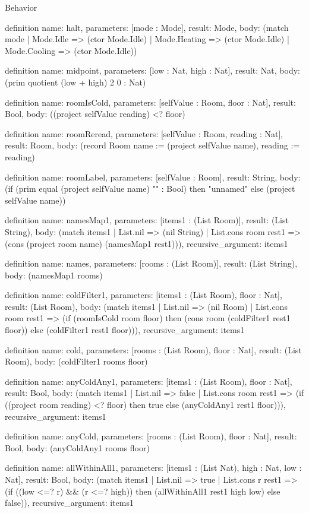 \begin{lexlean}{Behavior}
\begin{semanticmodule}
definition{
  name: halt,
  parameters: [mode : Mode],
  result: Mode,
  body: (match mode
    | Mode.Idle => (ctor Mode.Idle)
    | Mode.Heating => (ctor Mode.Idle)
    | Mode.Cooling => (ctor Mode.Idle))
}

definition{
  name: midpoint,
  parameters: [low : Nat, high : Nat],
  result: Nat,
  body: (prim quotient (low + high) 2 0 : Nat)
}

definition{
  name: roomIsCold,
  parameters: [selfValue : Room, floor : Nat],
  result: Bool,
  body: ((project selfValue reading) <? floor)
}

definition{
  name: roomReread,
  parameters: [selfValue : Room, reading : Nat],
  result: Room,
  body: (record Room {name := (project selfValue name), reading := reading})
}

definition{
  name: roomLabel,
  parameters: [selfValue : Room],
  result: String,
  body: (if (prim equal (project selfValue name) "" : Bool) then "unnamed" else (project selfValue name))
}

definition{
  name: namesMap1,
  parameters: [items1 : (List Room)],
  result: (List String),
  body: (match items1
    | List.nil => (nil String)
    | List.cons room rest1 => (cons (project room name) (namesMap1 rest1))),
  recursive_argument: items1
}

definition{
  name: names,
  parameters: [rooms : (List Room)],
  result: (List String),
  body: (namesMap1 rooms)
}

definition{
  name: coldFilter1,
  parameters: [items1 : (List Room), floor : Nat],
  result: (List Room),
  body: (match items1
    | List.nil => (nil Room)
    | List.cons room rest1 => (if (roomIsCold room floor) then (cons room (coldFilter1 rest1 floor)) else (coldFilter1 rest1 floor))),
  recursive_argument: items1
}

definition{
  name: cold,
  parameters: [rooms : (List Room), floor : Nat],
  result: (List Room),
  body: (coldFilter1 rooms floor)
}

definition{
  name: anyColdAny1,
  parameters: [items1 : (List Room), floor : Nat],
  result: Bool,
  body: (match items1
    | List.nil => false
    | List.cons room rest1 => (if ((project room reading) <? floor) then true else (anyColdAny1 rest1 floor))),
  recursive_argument: items1
}

definition{
  name: anyCold,
  parameters: [rooms : (List Room), floor : Nat],
  result: Bool,
  body: (anyColdAny1 rooms floor)
}

definition{
  name: allWithinAll1,
  parameters: [items1 : (List Nat), high : Nat, low : Nat],
  result: Bool,
  body: (match items1
    | List.nil => true
    | List.cons r rest1 => (if ((low <=? r) && (r <=? high)) then (allWithinAll1 rest1 high low) else false)),
  recursive_argument: items1
}


\end{semanticmodule}
\end{lexlean}
